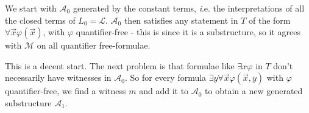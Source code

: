 \documentclass[]{article}
\theoremstyle{custhm}
\theoremstyle{cusdef}
\theoremstyle{custhm}
\theoremstyle{custhm}
\theoremstyle{custhm}
\theoremstyle{custhm}
\theoremstyle{cusdef}
\theoremstyle{remark}
\renewcommand{\L}{\mathcal{L}}
\renewcommand{\it}[1]{\textit{#1}}
\newcommand{\M}{\mathcal{M}}
\renewcommand{\phi}{\varphi}
\newcommand{\A}{\mathcal{A}}
\begin{document}
We start with $\A_0$ generated by the constant terms, {\it i.e.} the interpretations of all the closed terms of $L_0 = \L$. $\A_0$ then satisfies any statement in $T$ of the form $\forall \overrightarrow{x} \phi(\overrightarrow{x})$, with $\phi$ quantifier-free - this is since it is a substructure, so it agrees with $\M$ on all quantifier free-formulae.

This is a decent start. The next problem is that formulae like $\exists x\phi$ in $T$ don't necessarily have witnesses in $\A_0$. So for every formula $\exists y \forall \overrightarrow{x} \phi(\overrightarrow{x},y)$ with $\phi$ quantifier-free, we find a witness $m$ and add it to $\A_0$ to obtain a new generated substructure $\A_1$.
\end{document}
